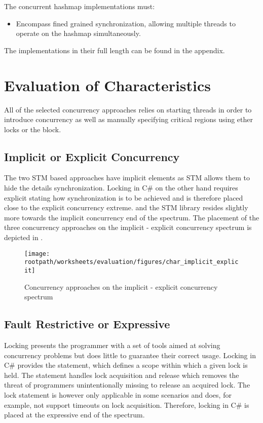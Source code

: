 The concurrent hashmap implementations must:
\begin{itemize}
	\item Encompass fined grained synchronization, allowing multiple threads to operate on the hashmap simultaneously.
\end{itemize}
The implementations in their full length can be found in the appendix.

\section{Evaluation of Characteristics}
All of the selected concurrency approaches relies on starting threads in order to introduce concurrency as well as manually specifying critical regions using ether locks or the  block. 
\subsection{Implicit or Explicit Concurrency}
The two \ac{STM} based approaches have implicit elements as \ac{STM} allows them to hide the details synchronization. Locking in C\# on the other hand requires explicit stating how synchronization is to be achieved and is therefore placed close to the explicit concurrency extreme. \stmnamesp and the \ac{STM} library resides slightly more towards the implicit concurrency end of the spectrum. The placement of the three concurrency approaches on the implicit - explicit concurrency spectrum is depicted in .

\begin{figure}[htbp]
\centering
 \texttt{[image: \\rootpath/worksheets/evaluation/figures/char\_implicit\_explicit]} 
 \caption{Concurrency approaches on the implicit - explicit concurrency spectrum}
\label{fig:char_implicit_explicit}
\end{figure}

\subsection{Fault Restrictive or Expressive}
Locking presents the programmer with a set of tools aimed at solving concurrency problems but does little to guarantee their correct usage. Locking in C\# provides the  statement\cite[p. 102]{csharp2013specificaiton}, which defines a scope within which a given lock is held. The  statement handles lock acquisition and release which removes the threat of programmers unintentionally missing to release an acquired lock. The lock statement is however only applicable in some scenarios and does, for example, not support timeouts on lock acquisition. Therefore, locking in C\# is placed at the expressive end of the spectrum.

